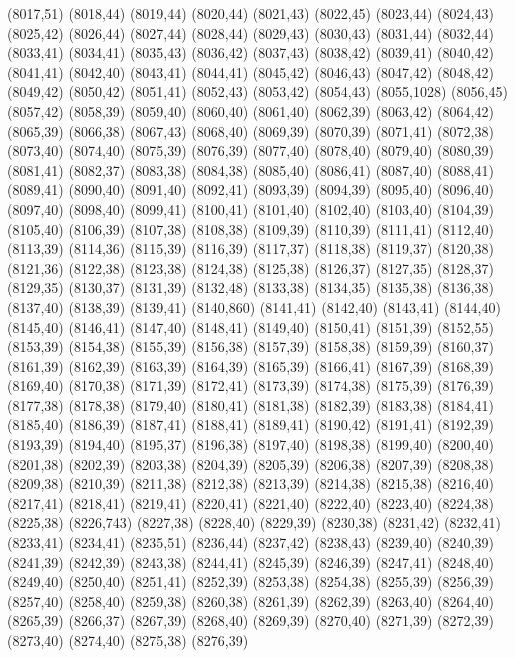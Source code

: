 (8017,51)
(8018,44)
(8019,44)
(8020,44)
(8021,43)
(8022,45)
(8023,44)
(8024,43)
(8025,42)
(8026,44)
(8027,44)
(8028,44)
(8029,43)
(8030,43)
(8031,44)
(8032,44)
(8033,41)
(8034,41)
(8035,43)
(8036,42)
(8037,43)
(8038,42)
(8039,41)
(8040,42)
(8041,41)
(8042,40)
(8043,41)
(8044,41)
(8045,42)
(8046,43)
(8047,42)
(8048,42)
(8049,42)
(8050,42)
(8051,41)
(8052,43)
(8053,42)
(8054,43)
(8055,1028)
(8056,45)
(8057,42)
(8058,39)
(8059,40)
(8060,40)
(8061,40)
(8062,39)
(8063,42)
(8064,42)
(8065,39)
(8066,38)
(8067,43)
(8068,40)
(8069,39)
(8070,39)
(8071,41)
(8072,38)
(8073,40)
(8074,40)
(8075,39)
(8076,39)
(8077,40)
(8078,40)
(8079,40)
(8080,39)
(8081,41)
(8082,37)
(8083,38)
(8084,38)
(8085,40)
(8086,41)
(8087,40)
(8088,41)
(8089,41)
(8090,40)
(8091,40)
(8092,41)
(8093,39)
(8094,39)
(8095,40)
(8096,40)
(8097,40)
(8098,40)
(8099,41)
(8100,41)
(8101,40)
(8102,40)
(8103,40)
(8104,39)
(8105,40)
(8106,39)
(8107,38)
(8108,38)
(8109,39)
(8110,39)
(8111,41)
(8112,40)
(8113,39)
(8114,36)
(8115,39)
(8116,39)
(8117,37)
(8118,38)
(8119,37)
(8120,38)
(8121,36)
(8122,38)
(8123,38)
(8124,38)
(8125,38)
(8126,37)
(8127,35)
(8128,37)
(8129,35)
(8130,37)
(8131,39)
(8132,48)
(8133,38)
(8134,35)
(8135,38)
(8136,38)
(8137,40)
(8138,39)
(8139,41)
(8140,860)
(8141,41)
(8142,40)
(8143,41)
(8144,40)
(8145,40)
(8146,41)
(8147,40)
(8148,41)
(8149,40)
(8150,41)
(8151,39)
(8152,55)
(8153,39)
(8154,38)
(8155,39)
(8156,38)
(8157,39)
(8158,38)
(8159,39)
(8160,37)
(8161,39)
(8162,39)
(8163,39)
(8164,39)
(8165,39)
(8166,41)
(8167,39)
(8168,39)
(8169,40)
(8170,38)
(8171,39)
(8172,41)
(8173,39)
(8174,38)
(8175,39)
(8176,39)
(8177,38)
(8178,38)
(8179,40)
(8180,41)
(8181,38)
(8182,39)
(8183,38)
(8184,41)
(8185,40)
(8186,39)
(8187,41)
(8188,41)
(8189,41)
(8190,42)
(8191,41)
(8192,39)
(8193,39)
(8194,40)
(8195,37)
(8196,38)
(8197,40)
(8198,38)
(8199,40)
(8200,40)
(8201,38)
(8202,39)
(8203,38)
(8204,39)
(8205,39)
(8206,38)
(8207,39)
(8208,38)
(8209,38)
(8210,39)
(8211,38)
(8212,38)
(8213,39)
(8214,38)
(8215,38)
(8216,40)
(8217,41)
(8218,41)
(8219,41)
(8220,41)
(8221,40)
(8222,40)
(8223,40)
(8224,38)
(8225,38)
(8226,743)
(8227,38)
(8228,40)
(8229,39)
(8230,38)
(8231,42)
(8232,41)
(8233,41)
(8234,41)
(8235,51)
(8236,44)
(8237,42)
(8238,43)
(8239,40)
(8240,39)
(8241,39)
(8242,39)
(8243,38)
(8244,41)
(8245,39)
(8246,39)
(8247,41)
(8248,40)
(8249,40)
(8250,40)
(8251,41)
(8252,39)
(8253,38)
(8254,38)
(8255,39)
(8256,39)
(8257,40)
(8258,40)
(8259,38)
(8260,38)
(8261,39)
(8262,39)
(8263,40)
(8264,40)
(8265,39)
(8266,37)
(8267,39)
(8268,40)
(8269,39)
(8270,40)
(8271,39)
(8272,39)
(8273,40)
(8274,40)
(8275,38)
(8276,39)
